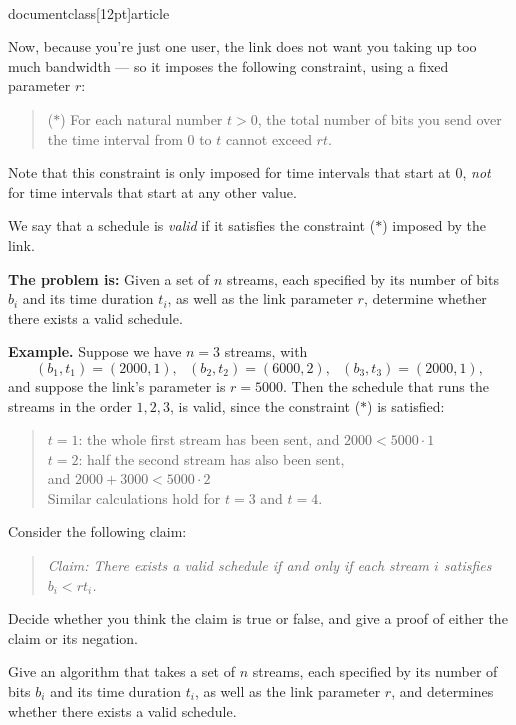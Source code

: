 \\documentclass[12pt]{article}
\begin{document}
\begin{enumerate}
Now, because you're just one user, the link does not want
you taking up too much bandwidth --- so it imposes the
following constraint, using a fixed parameter $r$:
\begin{quote}
($\ast$) For each natural number $t > 0$, the total number of bits you send
over the time interval from $0$ to $t$ cannot exceed $rt$.
\end{quote}
Note that this constraint is only imposed for time
intervals that start at $0$, {\em not} for time
intervals that start at any other value.

We say that a schedule is {\em valid} if it satisfies
the constraint ($\ast$) imposed by the link.

\bigskip
\bigskip
{\bf The problem is:} Given a set of $n$ streams,
each specified by its number of bits $b_i$
and its time duration $t_i$,
as well as the link parameter $r$,
determine whether there exists a valid schedule.

\bigskip
\bigskip
{\bf Example.}  Suppose we have $n = 3$ streams, with
$$(b_1,t_1) = (2000,1), ~~~ (b_2,t_2) = (6000,2), ~~~ (b_3,t_3)
= (2000,1),$$
and suppose the link's parameter is $r = 5000$.
Then the schedule that runs the streams in the order $1, 2, 3$,
is valid, since the constraint ($\ast$) is satisfied:
\begin{quote}
$t = 1$: the whole first stream has been sent, and $2000 < 5000 \cdot 1$ \\
$t = 2$: half the second stream has also been sent, \\
\hspace*{0.5in} and $2000 + 3000 < 5000 \cdot 2$ \\
Similar calculations hold for $t = 3$ and $t = 4$.
\end{quote}


Consider the following claim:
\begin{quote}
{\em Claim: There exists a valid schedule if and only
if each stream $i$ satisfies $b_i < r t_i$.}
\end{quote}
Decide whether you think the claim is true or false,
and give a proof of either the claim or its negation.

Give an algorithm that takes a set of $n$ streams,
each specified by its number of bits $b_i$
and its time duration $t_i$,
as well as the link parameter $r$,
and determines whether there exists a valid schedule.


\end{enumerate}
\end{document}
